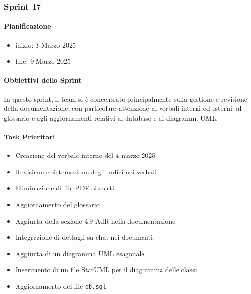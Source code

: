 \documentclass{article}
\begin{document}
                
            \subsubsection{Sprint 17}
            \paragraph{Pianificazione}
                \begin{itemize}
                    \item inizio: 3 Marzo 2025
                    \item fine: 9 Marzo 2025
                \end{itemize}
            
            \paragraph{Obbiettivi dello Sprint}
            In questo sprint, il team si è concentrato principalmente sulla gestione e revisione della documentazione, con particolare attenzione ai verbali interni ed esterni, al glossario e agli aggiornamenti relativi al database e ai diagrammi UML.
            
            \paragraph{Task Prioritari}
            \begin{itemize}
                \item Creazione del verbale interno del 4 marzo 2025
                \item Revisione e sistemazione degli indici nei verbali
                \item Eliminazione di file PDF obsoleti
                \item Aggiornamento del glossario
                \item Aggiunta della sezione 4.9 AdR nella documentazione
                \item Integrazione di dettagli su chat nei documenti
                \item Aggiunta di un diagramma UML esagonale
                \item Inserimento di un file StarUML per il diagramma delle classi
                \item Aggiornamento del file \texttt{db.sql}
            \end{itemize}
            
\end{document}
